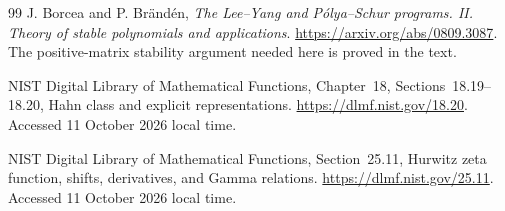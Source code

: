 \documentclass[11pt,letterpaper]{article}
\numberwithin{equation}{section}
\theoremstyle{definition}\newtheorem{definition}[theorem]{Definition}
\theoremstyle{remark}\newtheorem{remark}[theorem]{Remark}
\begin{document}
\begin{thebibliography}{99}
J. Borcea and P. Br\"and\'en, \emph{The Lee--Yang and P\'olya--Schur
programs. II. Theory of stable polynomials and applications}.
\url{https://arxiv.org/abs/0809.3087}.
The positive-matrix stability argument needed here is proved in the text.

NIST Digital Library of Mathematical Functions, Chapter~18,
Sections~18.19--18.20, Hahn class and explicit representations.
\url{https://dlmf.nist.gov/18.20}. Accessed 11 October 2026 local time.

NIST Digital Library of Mathematical Functions, Section~25.11,
Hurwitz zeta function, shifts, derivatives, and Gamma relations.
\url{https://dlmf.nist.gov/25.11}. Accessed 11 October 2026 local time.

\end{thebibliography}
\end{document}
